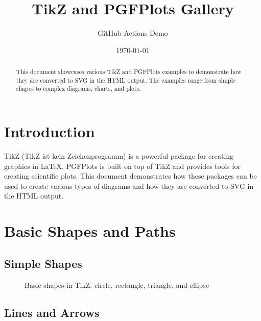 \documentclass{article}
\title{TikZ and PGFPlots Gallery}
\author{GitHub Actions Demo}
\date{\today}
\begin{document}
\maketitle

\begin{abstract}
  This document showcases various TikZ and PGFPlots examples to demonstrate how they are converted to SVG in the HTML output. The examples range from simple shapes to complex diagrams, charts, and plots.
\end{abstract}

\section{Introduction}

TikZ (TikZ ist kein Zeichenprogramm) is a powerful package for creating graphics in \LaTeX. PGFPlots is built on top of TikZ and provides tools for creating scientific plots. This document demonstrates how these packages can be used to create various types of diagrams and how they are converted to SVG in the HTML output.

\section{Basic Shapes and Paths}

\subsection{Simple Shapes}

\begin{figure}[h]
  \centering
  \caption{Basic shapes in TikZ: circle, rectangle, triangle, and ellipse}
\end{figure}

\subsection{Lines and Arrows}
\end{document}
